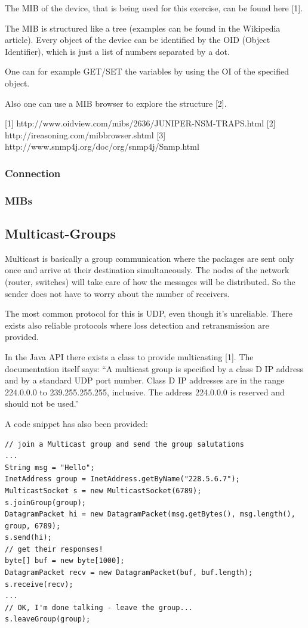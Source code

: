 \documentclass[11pt, a4paper]{article}
\begin{document}
The MIB of the device, that is being used for this exercise, can be found here [1].

The MIB is structured like a tree (examples can be found in the Wikipedia article). Every object of the device can be identified by the OID (Object Identifier), which is just a list of numbers separated by a dot.

One can for example GET/SET the variables by using the OI of the specified object.

Also one can use a MIB browser to explore the structure [2].

[1] http://www.oidview.com/mibs/2636/JUNIPER-NSM-TRAPS.html
[2] http://ireasoning.com/mibbrowser.shtml 
[3] http://www.snmp4j.org/doc/org/snmp4j/Snmp.html 
\subsubsection{Connection}
\subsubsection{MIBs}
\subsection{Multicast-Groups}

Multicast is basically a group communication where the packages are sent only once and arrive at their destination simultaneously. The nodes of the network (router, switches) will take care of how the messages will be distributed. So the sender does not have to worry about the number of receivers.

The most common protocol for this is UDP, even though it’s unreliable. There exists also reliable protocols where loss detection and retransmission are provided.


In the Java API there exists a class to provide multicasting [1]. The documentation itself says:
“A multicast group is specified by a class D IP address and by a standard UDP port number. Class D IP addresses are in the range 224.0.0.0 to 239.255.255.255, inclusive. The address 224.0.0.0 is reserved and should not be used.”

A code snippet has also been provided:

\begin{lstlisting}
// join a Multicast group and send the group salutations
...
String msg = "Hello";
InetAddress group = InetAddress.getByName("228.5.6.7");
MulticastSocket s = new MulticastSocket(6789);
s.joinGroup(group);
DatagramPacket hi = new DatagramPacket(msg.getBytes(), msg.length(),
group, 6789);
s.send(hi);
// get their responses!
byte[] buf = new byte[1000];
DatagramPacket recv = new DatagramPacket(buf, buf.length);
s.receive(recv);
...
// OK, I'm done talking - leave the group...
s.leaveGroup(group);
\end{lstlisting}
\end{document}
